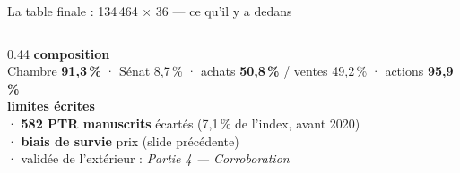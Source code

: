 \documentclass[11pt,aspectratio=169]{beamer}
\begin{document}
\begin{frame}{La table finale : 134\,464 × 36 --- ce qu'il y a dedans}
\begin{columns}[T]
\begin{column}{0.44\textwidth}
      {\footnotesize\textbf{composition}}\\[0.3mm]
      {\scriptsize Chambre \textbf{91,3\,\%} · Sénat 8,7\,\% \;·\; achats \textbf{50,8\,\%} / ventes 49,2\,\%
       \;·\; actions \textbf{95,9\,\%}}\\[1.2mm]
      {\footnotesize\textbf{limites écrites}}\\[0.3mm]
      {\scriptsize · \textbf{582 PTR manuscrits} écartés (7,1\,\% de l'index, avant 2020)\\
       · \textbf{biais de survie} prix (slide précédente)\\
       · validée de l'extérieur : \emph{Partie 4 — Corroboration}}
    \end{column}
  \end{columns}
\end{frame}
\end{document}
